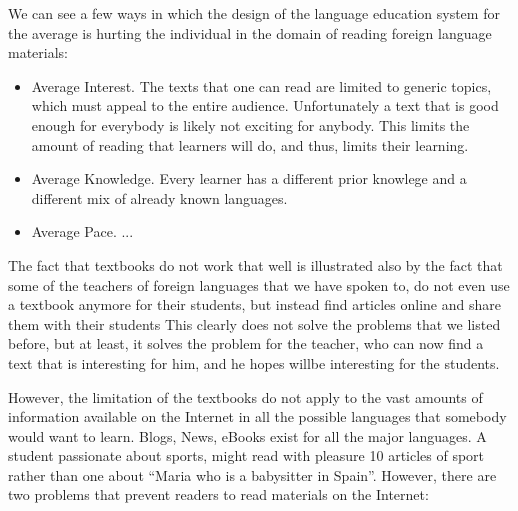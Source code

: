 We can see a few ways in which the design of the language education system for the average is hurting the individual in the domain of reading foreign language materials: 

\begin{itemize}
	\item Average Interest. The texts that one can read are limited to generic topics, which must appeal to the entire audience. Unfortunately a text that is good enough for everybody is likely not exciting for anybody. This limits the amount of reading that learners will do, and thus, limits their learning.
	\item Average Knowledge.  Every learner has a different prior knowlege and a different mix of already known languages. 
	\item Average Pace. ... 
\end{itemize}


The fact that textbooks do not work that well is illustrated also by the fact that some of the teachers of foreign languages that we have spoken to, do not even use a textbook anymore for their students, but instead find articles online and share them with their students  This clearly does not solve the problems that we listed before, but at least, it solves the problem for the teacher, who can now find a text that is interesting for him, and he hopes willbe interesting for the students.

However, the limitation of the textbooks do not apply to the vast amounts of information available on the Internet in all the possible languages that somebody would want to learn. Blogs, News, eBooks exist for all the major languages. A student passionate about sports, might read with pleasure 10 articles of sport rather than one about ``Maria who is a babysitter in Spain''. However, there are two problems that prevent readers to read materials on the Internet:

